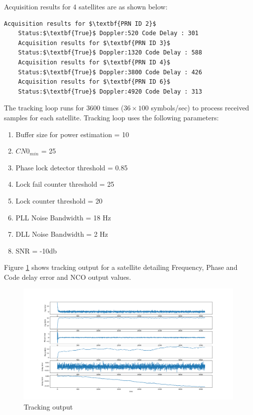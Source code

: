 \documentclass[conference]{IEEEtran}
\begin{document}
Acquisition results for 4 satellites are as shown below:
\begin{lstlisting}[mathescape=true]
	Acquisition results for $\textbf{PRN ID 2}$
 	Status:$\textbf{True}$ Doppler:520 Code Delay : 301
	Acquisition results for $\textbf{PRN ID 3}$
 	Status:$\textbf{True}$ Doppler:1320 Code Delay : 588
	Acquisition results for $\textbf{PRN ID 4}$
 	Status:$\textbf{True}$ Doppler:3800 Code Delay : 426
	Acquisition results for $\textbf{PRN ID 6}$
 	Status:$\textbf{True}$ Doppler:4920 Code Delay : 313
\end{lstlisting}

The tracking loop runs for 3600 times ($36\times100$ symbols/sec) to process received samples for 
each satellite. Tracking loop uses the following parameters:
\begin{enumerate}
	\item Buffer size for power estimation = 10
	\item  $CN0_{min}$ = 25
	\item Phase lock detector threshold = 0.85
	\item Lock fail counter threshold = 25 
	\item Lock counter threshold = 20
	\item PLL Noise Bandwidth = 18 Hz
	\item DLL Noise Bandwidth = 2 Hz
	\item SNR = -10db
\end{enumerate}
Figure \ref{fig:tracking_output} shows tracking output for a satellite detailing Frequency, Phase and Code delay error and NCO output values.
\begin{figure}[ht]
	\centering
	\includegraphics[width=1\columnwidth]{figs/tracking_output.png}
	\centering
	\caption{Tracking output}
	\label{fig:tracking_output}
\end{figure}
\end{document}
